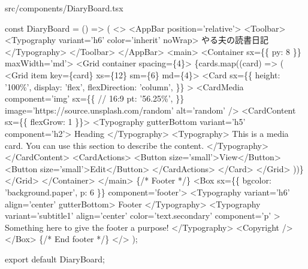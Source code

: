 \begin{starterprogram}[]{src/components/DiaryBoard.tsx}
{  const DiaryBoard = () =\textgreater{} (
    \textless{}\textgreater{}
      \textless{}AppBar position='relative'\textgreater{}
        \textless{}Toolbar\textgreater{}
          \textless{}Typography variant='h6' color='inherit' noWrap\textgreater{}
            やる夫の読書日記
          \textless{}/Typography\textgreater{}
        \textless{}/Toolbar\textgreater{}
      \textless{}/AppBar\textgreater{}
      \textless{}main\textgreater{}
        \textless{}Container sx=\{\{ py: 8 \}\} maxWidth='md'\textgreater{}
          \textless{}Grid container spacing=\{4\}\textgreater{}
            \{cards.map((card) =\textgreater{} (
              \textless{}Grid item key=\{card\} xs=\{12\} sm=\{6\} md=\{4\}\textgreater{}
                \textless{}Card
                  sx=\{\{
                    height: '100\%',
                    display: 'flex',
                    flexDirection: 'column',
                  \}\}
                \textgreater{}
                  \textless{}CardMedia
                    component='img'
                    sx=\{\{
                      // 16:9
                      pt: '56.25\%',
                    \}\}
                    image='https://source.unsplash.com/random'
                    alt='random'
                  /\textgreater{}
                  \textless{}CardContent sx=\{\{ flexGrow: 1 \}\}\textgreater{}
                    \textless{}Typography gutterBottom variant='h5' component='h2'\textgreater{}
                      Heading
                    \textless{}/Typography\textgreater{}
                    \textless{}Typography\textgreater{}
                      This is a media card. You can use this section to describe
                      the content.
                    \textless{}/Typography\textgreater{}
                  \textless{}/CardContent\textgreater{}
                  \textless{}CardActions\textgreater{}
                    \textless{}Button size='small'\textgreater{}View\textless{}/Button\textgreater{}
                    \textless{}Button size='small'\textgreater{}Edit\textless{}/Button\textgreater{}
                  \textless{}/CardActions\textgreater{}
                \textless{}/Card\textgreater{}
              \textless{}/Grid\textgreater{}
            ))\}
          \textless{}/Grid\textgreater{}
        \textless{}/Container\textgreater{}
      \textless{}/main\textgreater{}
      \{/* Footer */\}
      \textless{}Box sx=\{\{ bgcolor: 'background.paper', p: 6 \}\} component='footer'\textgreater{}
        \textless{}Typography variant='h6' align='center' gutterBottom\textgreater{}
          Footer
        \textless{}/Typography\textgreater{}
        \textless{}Typography
          variant='subtitle1'
          align='center'
          color='text.secondary'
          component='p'
        \textgreater{}
          Something here to give the footer a purpose!
        \textless{}/Typography\textgreater{}
        \textless{}Copyright /\textgreater{}
      \textless{}/Box\textgreater{}
      \{/* End footer */\}
    \textless{}/\textgreater{}
  );

  export default DiaryBoard;
}\end{starterprogram}

